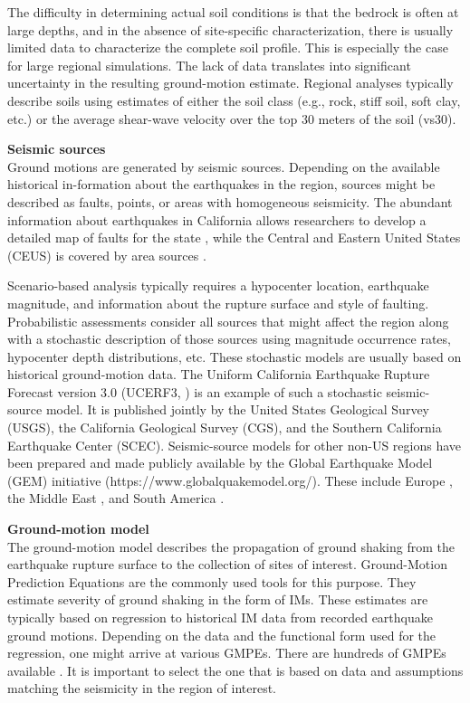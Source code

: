 The difficulty in determining actual soil conditions is that the bedrock is often at large depths, and in the absence of site-specific characterization, there is usually limited data to characterize the complete soil profile. This is especially the case for large regional simulations. The lack of data translates into significant uncertainty in the resulting ground-motion estimate. Regional analyses typically describe soils using estimates of either the soil class (e.g., rock, stiff soil, soft clay, etc.) or the average shear-wave velocity over the top 30 meters of the soil (vs30). 
\newline

\noindent\textbf{Seismic sources} \\Ground motions are generated by seismic sources. Depending on the available historical in-formation about the earthquakes in the region, sources might be described as faults, points, or areas with homogeneous seismicity. The abundant information about earthquakes in California allows researchers to develop a detailed map of faults for the state \citep{field2014uniform}, while the Central and Eastern United States (CEUS) is covered by area sources \citep{mueller2015seismic}.

Scenario-based analysis typically requires a hypocenter location, earthquake magnitude, and information about the rupture surface and style of faulting. Probabilistic assessments consider all sources that might affect the region along with a stochastic description of those sources using magnitude occurrence rates, hypocenter depth distributions, etc. These stochastic models are usually based on historical ground-motion data. The Uniform California Earthquake Rupture Forecast version 3.0 (UCERF3, \cite{field2014uniform}) is an example of such a stochastic seismic-source model. It is published jointly by the United States Geological Survey (USGS), the California Geological Survey (CGS), and the Southern California Earthquake Center (SCEC). Seismic-source models for other non-US regions have been prepared and made publicly available by the Global Earthquake Model (GEM) initiative (https://www.globalquakemodel.org/). These include Europe \citep{giardini2014mapping}, the Middle East \citep{danciu20172014}, and South America \citep{garcia2018creation}.
\newline

\noindent\textbf{Ground-motion model} \\The ground-motion model describes the propagation of ground shaking from the earthquake rupture surface to the collection of sites of interest. Ground-Motion Prediction Equations are the commonly used tools for this purpose. They estimate severity of ground shaking in the form of IMs. These estimates are typically based on regression to historical IM data from recorded earthquake ground motions. Depending on the data and the functional form used for the regression, one might arrive at various GMPEs. There are hundreds of GMPEs available \citep{douglas2018ground}. It is important to select the one that is based on data and assumptions matching the seismicity in the region of interest.
\newline

